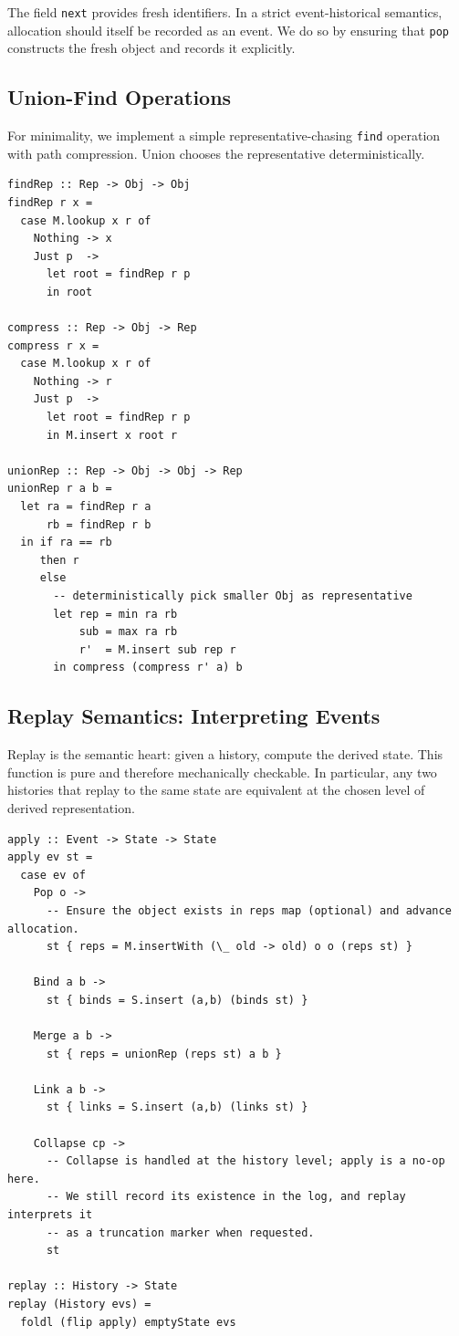 \documentclass[11pt]{article}
\begin{document}
The field \texttt{next} provides fresh identifiers. In a strict event-historical
semantics, allocation should itself be recorded as an event. We do so by
ensuring that \texttt{pop} constructs the fresh object and records it explicitly.

\subsection{Union-Find Operations}

For minimality, we implement a simple representative-chasing \texttt{find}
operation with path compression. Union chooses the representative deterministically.

\begin{verbatim}
findRep :: Rep -> Obj -> Obj
findRep r x =
  case M.lookup x r of
    Nothing -> x
    Just p  ->
      let root = findRep r p
      in root

compress :: Rep -> Obj -> Rep
compress r x =
  case M.lookup x r of
    Nothing -> r
    Just p  ->
      let root = findRep r p
      in M.insert x root r

unionRep :: Rep -> Obj -> Obj -> Rep
unionRep r a b =
  let ra = findRep r a
      rb = findRep r b
  in if ra == rb
     then r
     else
       -- deterministically pick smaller Obj as representative
       let rep = min ra rb
           sub = max ra rb
           r'  = M.insert sub rep r
       in compress (compress r' a) b
\end{verbatim}

\subsection{Replay Semantics: Interpreting Events}

Replay is the semantic heart: given a history, compute the derived state. This
function is pure and therefore mechanically checkable. In particular, any two
histories that replay to the same state are equivalent at the chosen level of
derived representation.

\begin{verbatim}
apply :: Event -> State -> State
apply ev st =
  case ev of
    Pop o ->
      -- Ensure the object exists in reps map (optional) and advance allocation.
      st { reps = M.insertWith (\_ old -> old) o o (reps st) }

    Bind a b ->
      st { binds = S.insert (a,b) (binds st) }

    Merge a b ->
      st { reps = unionRep (reps st) a b }

    Link a b ->
      st { links = S.insert (a,b) (links st) }

    Collapse cp ->
      -- Collapse is handled at the history level; apply is a no-op here.
      -- We still record its existence in the log, and replay interprets it
      -- as a truncation marker when requested.
      st

replay :: History -> State
replay (History evs) =
  foldl (flip apply) emptyState evs
\end{verbatim}
\end{document}
